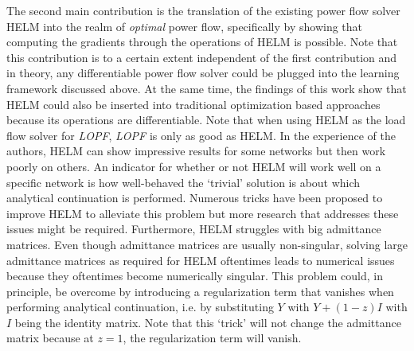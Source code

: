 The second main contribution is the translation of the existing power flow solver HELM into the realm of \emph{optimal} power flow, specifically by showing that computing the gradients through the operations of HELM is possible. Note that this contribution is to a certain extent independent of the first contribution and in theory, any differentiable power flow solver could be plugged into the learning framework discussed above. At the same time, the findings of this work show that HELM could also be inserted into traditional optimization based approaches because its operations are differentiable. Note that when using HELM as the load flow solver for \emph{LOPF}, \emph{LOPF} is only as good as HELM. In the experience of the authors, HELM can show impressive results for some networks but then work poorly on others. An indicator for whether or not HELM will work well on a specific network is how well-behaved the `trivial' solution is about which analytical continuation is performed. Numerous tricks have been proposed to improve HELM to alleviate this problem but more research that addresses these issues might be required. Furthermore, HELM struggles with big admittance matrices.  Even though admittance matrices are usually non-singular, solving large admittance matrices as required for HELM oftentimes leads to numerical issues because they oftentimes become numerically singular. This problem could, in principle, be overcome by introducing a regularization term that vanishes when performing analytical continuation, i.e. by substituting $Y$ with $Y + (1-z)I$ with $I$ being the identity matrix. Note that this `trick' will not change the admittance matrix because at $z=1$, the regularization term will vanish.


